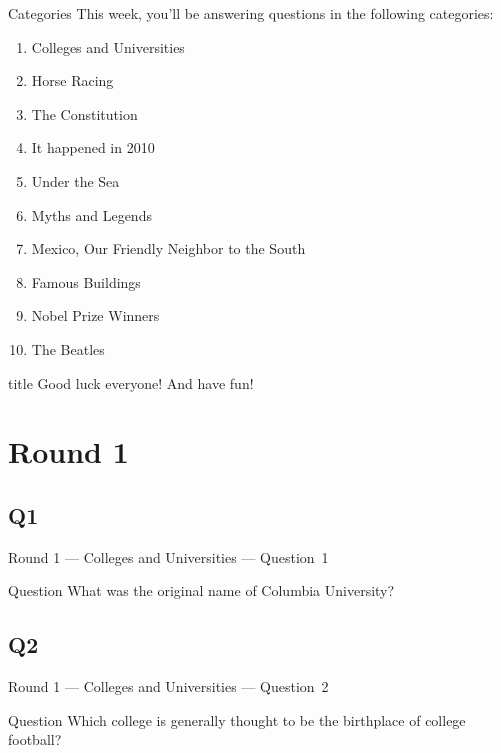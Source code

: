 \documentclass[11pt]{beamer}
\begin{document}
\begingroup{}
\begin{frame}[t]{Categories}
This week, you'll be answering questions in the following categories:
\begin{enumerate}
\item Colleges and Universities
\item Horse Racing
\item The Constitution
\item It happened in 2010
\item Under the Sea
\item Myths and Legends
\item Mexico, Our Friendly Neighbor to the South
\item Famous Buildings
\item Nobel Prize Winners
\item The Beatles
\end{enumerate}
\end{frame}
\endgroup{}

\begingroup{}
\begin{frame}
\vfill{}
\begin{beamercolorbox}[sep=8pt,center,shadow=true,rounded=true]{title}
Good luck everyone! And have fun!
\end{beamercolorbox}
\vfill{}
\end{frame}
\endgroup{}
\def\thisSectionName{Colleges and Universities}
\section{Round 1}
\subsection*{Q1}
\begin{frame}[t]{Round 1 --- Colleges and Universities --- \mbox{Question 1}}
\vspace{-0.5em}
\begin{block}{Question}
What was the original name of Columbia University?
\end{block}
\end{frame}
\subsection*{Q2}
\begin{frame}[t]{Round 1 --- Colleges and Universities --- \mbox{Question 2}}
\vspace{-0.5em}
\begin{block}{Question}
Which college is generally  thought to be the birthplace of college football? 
\end{block}
\end{frame}
\end{document}
